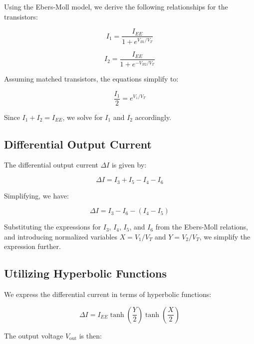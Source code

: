 \documentclass[a4paper,9pt,twoside,openany,twocolumn]{memoir}
\begin{document}
Using the Ebers-Moll model, we derive the following relationships for the transistors:

\begin{equation}
I_1 = \frac{I_{EE}}{1 + e^{V_{B1}/V_T}}
\end{equation}

\begin{equation}
I_2 = \frac{I_{EE}}{1 + e^{-V_{B2}/V_T}}
\end{equation}

Assuming matched transistors, the equations simplify to:

\begin{equation}
\frac{I_1}{2} = e^{V_1/V_T}
\end{equation}

Since \( I_1 + I_2 = I_{EE} \), we solve for \( I_1 \) and \( I_2 \) accordingly.

\subsection*{Differential Output Current}

The differential output current \( \Delta I \) is given by:

\begin{equation}
\Delta I = I_3 + I_5 - I_4 - I_6
\end{equation}

Simplifying, we have:

\begin{equation}
\Delta I = I_3 - I_6 - (I_4 - I_5)
\end{equation}

Substituting the expressions for \( I_3 \), \( I_4 \), \( I_5 \), and \( I_6 \) from the Ebers-Moll relations, and introducing normalized variables \( X = V_1/V_T \) and \( Y = V_2/V_T \), we simplify the expression further.

\subsection{Utilizing Hyperbolic Functions}

We express the differential current in terms of hyperbolic functions:

\begin{equation}
\Delta I = I_{EE} \tanh\left(\frac{Y}{2}\right) \tanh\left(\frac{X}{2}\right)
\end{equation}

The output voltage \( V_{\text{out}} \) is then:
\end{document}
